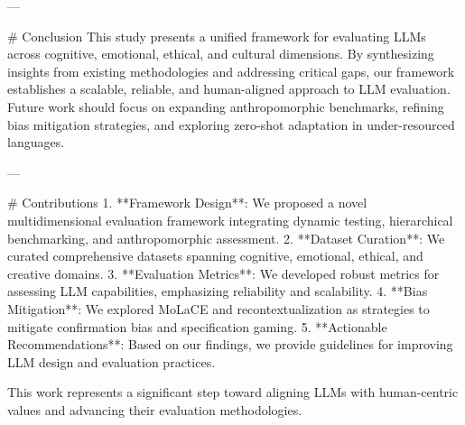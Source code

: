 ---

# Conclusion  
This study presents a unified framework for evaluating LLMs across cognitive, emotional, ethical, and cultural dimensions. By synthesizing insights from existing methodologies and addressing critical gaps, our framework establishes a scalable, reliable, and human-aligned approach to LLM evaluation. Future work should focus on expanding anthropomorphic benchmarks, refining bias mitigation strategies, and exploring zero-shot adaptation in under-resourced languages.

---

# Contributions  
1. **Framework Design**: We proposed a novel multidimensional evaluation framework integrating dynamic testing, hierarchical benchmarking, and anthropomorphic assessment.  
2. **Dataset Curation**: We curated comprehensive datasets spanning cognitive, emotional, ethical, and creative domains.  
3. **Evaluation Metrics**: We developed robust metrics for assessing LLM capabilities, emphasizing reliability and scalability.  
4. **Bias Mitigation**: We explored MoLaCE and recontextualization as strategies to mitigate confirmation bias and specification gaming.  
5. **Actionable Recommendations**: Based on our findings, we provide guidelines for improving LLM design and evaluation practices.  

This work represents a significant step toward aligning LLMs with human-centric values and advancing their evaluation methodologies.
